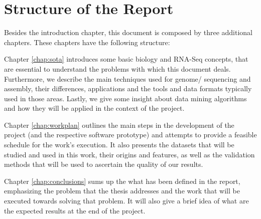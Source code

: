 \section{Structure of the Report} \label{sec:outline}

Besides the introduction chapter, this document is composed by three additional
chapters. These chapters have the following structure:

Chapter \ref{chap:sota} introduces some basic biology and RNA-Seq concepts,
that are essential to understand the problems with which this document deals.
Furthermore, we describe the main techniques used for genome/\trans{} sequencing
and assembly, their differences, applications and the tools and data formats
typically used in those areas. Lastly, we give some insight about data mining
algorithms and how they will be applied in the context of the project.

Chapter \ref{chap:workplan} outlines the main steps in the development of the
project (and the respective software prototype) and attempts to provide a
feasible schedule for the work's execution. It also presents the datasets that
will be studied and used in this work, their origins and features, as well as
the validation methods that will be used to ascertain the quality of our
results.

Chapter \ref{chap:conclusions} sums up the what has been defined in the report,
emphasizing the problem that the thesis addresses and the work that will be
executed towards solving that problem. It will also give a brief idea of what
are the expected results at the end of the project.
